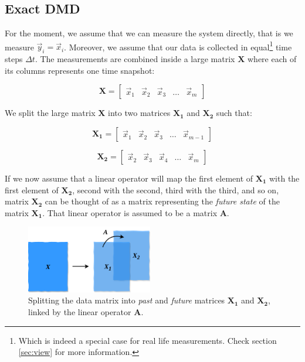 \documentclass[10pt,twocolumn]{article}
\begin{document}
\subsection{Exact DMD}

For the moment, we assume that we can measure the system directly, that is we measure $\vec{y}_i = \vec{x}_i$. Moreover, we assume that our data is collected in equal\footnote{Which is indeed a special case for real life measurements. Check section \ref{sec:view} for more information.} time steps $\Delta t$. The measurements are combined inside a large matrix $\bm{X}$ where each of its columns represents one time snapshot:

\begin{equation} \label{eq:X}
\bm{X} = 
\begin{bmatrix}
    \vec{x}_1 & \vec{x}_2 & \vec{x}_3 & \dots & \vec{x}_{m}
\end{bmatrix}
\end{equation}

We split the large matrix $\bm{X}$ into two matrices $\bm{X_1}$ and $\bm{X_2}$ such that:

\begin{equation} \label{eq:X1}
\bm{X_1} = 
\begin{bmatrix}
    \vec{x}_1 & \vec{x}_2 & \vec{x}_3 & \dots & \vec{x}_{m-1}
\end{bmatrix}
\end{equation}

\begin{equation} \label{eq:X2}
\bm{X_2} = 
\begin{bmatrix}
    \vec{x}_2 & \vec{x}_3 & \vec{x}_4 & \dots & \vec{x}_{m}
\end{bmatrix}
\end{equation}

If we now assume that a linear operator will map the first element of $\bm{X_1}$ with the first element of $\bm{X_2}$, second with the second, third with the third, and so on, matrix $\bm{X_2}$ can be thought of as a matrix representing the \textit{future state} of the matrix $\bm{X_1}$. That linear operator is assumed to be a matrix $\bm{A}$. 

\begin{figure}[H]
\centering\includegraphics[width=5.5cm]{data-split.png}
\caption{Splitting the data matrix into \textit{past} and \textit{future} matrices $\bm{X_1}$ and $\bm{X_2}$, linked by the linear operator $\bm{A}$.}
\label{fig:linear_system}
\end{figure}
\end{document}
